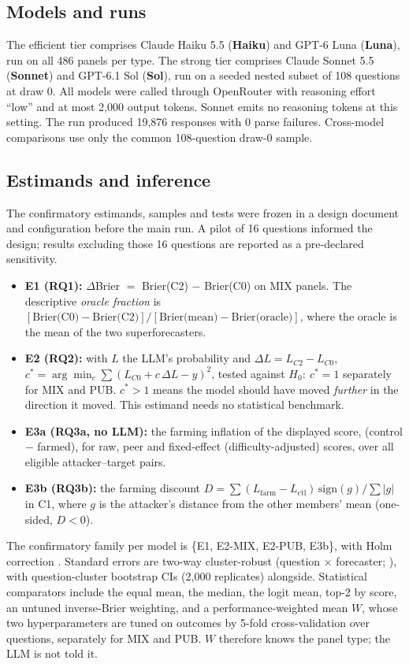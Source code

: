 \documentclass[11pt,letterpaper]{article}
\newcommand{\cstar}{c^{*}}
\begin{document}
\subsection{Models and runs}
The efficient tier comprises Claude Haiku 5.5 (\textbf{Haiku}) and GPT-6 Luna (\textbf{Luna}), run on all 486
panels per type. The strong tier comprises Claude Sonnet 5.5 (\textbf{Sonnet}) and GPT-6.1 Sol (\textbf{Sol}), run on a
seeded nested subset of 108 questions at draw 0. All models were called through OpenRouter with
reasoning effort ``low'' and at most 2,000 output tokens. Sonnet emits no reasoning tokens at this setting. The run
produced 19,876 responses with 0 parse failures. Cross-model comparisons use only the
common 108-question draw-0 sample.

\subsection{Estimands and inference}
The confirmatory estimands, samples and tests were frozen in a design document and configuration before the main run. A pilot of
16 questions informed the design; results excluding those 16 questions are reported as a pre-declared sensitivity.
\begin{itemize}
\item \textbf{E1 (RQ1):} $\Delta$Brier $=$ Brier(C2) $-$ Brier(C0) on MIX panels. The descriptive \emph{oracle
  fraction} is $[\text{Brier(C0)}-\text{Brier(C2)}]/[\text{Brier(mean)}-\text{Brier(oracle)}]$, where the oracle is the
  mean of the two superforecasters.
\item \textbf{E2 (RQ2):} with $L$ the LLM's probability and $\Delta L = L_{C2}-L_{C0}$,
  $\cstar = \arg\min_c \sum (L_{C0} + c\,\Delta L - y)^2$, tested against $H_0{:}\ \cstar=1$ separately for MIX and PUB.
  $\cstar>1$ means the model should have moved \emph{further} in the direction it moved. This estimand needs no
  statistical benchmark.
\item \textbf{E3a (RQ3a, no LLM):} the farming inflation of the displayed score, (control $-$ farmed), for raw, peer and
  fixed-effect (difficulty-adjusted) scores, over all \inflN{} eligible attacker--target pairs.
\item \textbf{E3b (RQ3b):} the farming discount
  $D=\sum (L_\text{farm}-L_\text{ctl})\,\mathrm{sign}(g)/\sum|g|$ in C1, where $g$ is the attacker's distance from the
  other members' mean (one-sided, $D<0$).
\end{itemize}
The confirmatory family per model is \{E1, E2-MIX, E2-PUB, E3b\}, with Holm correction \citep{holm1979}. Standard errors
are two-way cluster-robust (question $\times$ forecaster; \citep{cameron2011}), with question-cluster bootstrap CIs
(2,000 replicates) alongside. Statistical comparators include the equal mean, the median, the logit mean, top-2 by score,
an untuned inverse-Brier weighting, and a performance-weighted mean $W$, whose two hyperparameters are tuned on outcomes by 5-fold
cross-validation over questions, separately for MIX and PUB. $W$ therefore knows the panel type; the LLM is not told it.
\end{document}
